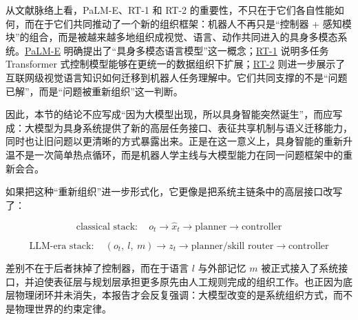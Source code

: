 从文献脉络上看，PaLM-E、RT-1 和 RT-2 的重要性，不只在于它们各自性能如何，而在于它们共同推动了一个新的组织框架：机器人不再只是“控制器 + 感知模块”的组合，而是被越来越多地组织成视觉、语言、动作共同进入的具身多模态系统。\href{https://arxiv.org/abs/2303.03378}{PaLM-E} 明确提出了“具身多模态语言模型”这一概念；\href{https://arxiv.org/abs/2212.06817}{RT-1} 说明多任务 Transformer 式控制模型能够在更统一的数据组织下扩展；\href{https://arxiv.org/abs/2307.15818}{RT-2} 则进一步展示了互联网级视觉语言知识如何迁移到机器人任务理解中。它们共同支撑的不是“问题已解”，而是“问题被重新组织”这一判断。

因此，本节的结论不应写成“因为大模型出现，所以具身智能突然诞生”，而应写成：大模型为具身系统提供了新的高层任务接口、表征共享机制与语义迁移能力，同时也让旧问题以更清晰的方式暴露出来。正是在这一意义上，具身智能的重新升温不是一次简单热点循环，而是机器人学主线与大模型能力在同一问题框架中的重新会合。

如果把这种“重新组织”进一步形式化，它更像是把系统主链条中的高层接口改写了：

\begingroup
\scriptsize
\begin{equation*}
\text{classical stack}:\quad o_t \rightarrow \hat x_t \rightarrow \text{planner} \rightarrow \text{controller}
\end{equation*}
\endgroup

\begingroup
\scriptsize
\begin{equation*}
\text{LLM-era stack}:\quad (o_t,\ l,\ m) \rightarrow z_t \rightarrow \text{planner/skill router} \rightarrow \text{controller}
\end{equation*}
\endgroup

差别不在于后者抹掉了控制器，而在于语言 \(l\) 与外部记忆 \(m\) 被正式接入了系统接口，并迫使表征层与规划层承担更多原先由人工规则完成的组织工作。也正因为底层物理闭环并未消失，本报告才会反复强调：大模型改变的是系统组织方式，而不是物理世界的约束定律。
